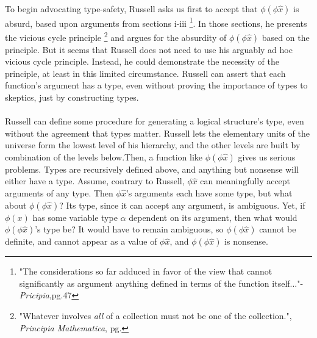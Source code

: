 \documentclass{article}
\begin{document}
\paragraph{}
To begin advocating type-safety, Russell asks us first to accept that $\phi(\phi\hat x)$ is absurd, based upon arguments from sections i-iii \footnote[3]{"The considerations so far adduced in favor of the view that cannot significantly as argument anything defined in terms of the function itself..."-\textit{Pricipia},pg.47}. In those sections, he presents the vicious cycle principle \footnote[4]{"Whatever involves \textit{all} of a collection must not be one of the collection.", \textit{Principia Mathematica}, pg.} and argues for the absurdity of $\phi(\phi\hat x)$ based on the principle. But it seems that Russell does not need to use his arguably ad hoc vicious cycle principle. Instead, he could demonstrate the necessity of the principle, at least in this limited circumstance. Russell can assert that each function’s argument has a type, even without proving the importance of types to skeptics, just by constructing types. 
\paragraph{}
Russell can define some procedure for generating a logical structure’s type, even without the agreement that types matter. Russell lets the elementary units of the universe form the lowest level of his hierarchy, and the other levels are built by combination of the levels below.Then, a function like $\phi(\phi\hat x)$ gives us serious problems. Types are recursively defined above, and anything but nonsense will either have a type. Assume, contrary to Russell, $\phi\hat x$ can meaningfully accept arguments of any type.
Then $\phi\hat x$’s arguments each have some type, but what about $\phi(\phi\hat x)$? Its type, since it can accept any argument, is ambiguous. Yet, if $\phi(x)$ has some variable type $\alpha$ dependent on its argument, then what would $\phi(\phi\hat x)$’s type be? It would have to remain ambiguous, so $\phi(\phi\hat x)$ cannot be definite, and cannot appear as a value of $\phi\hat x$, and $\phi(\phi\hat x)$ is nonsense.
\end{document}
